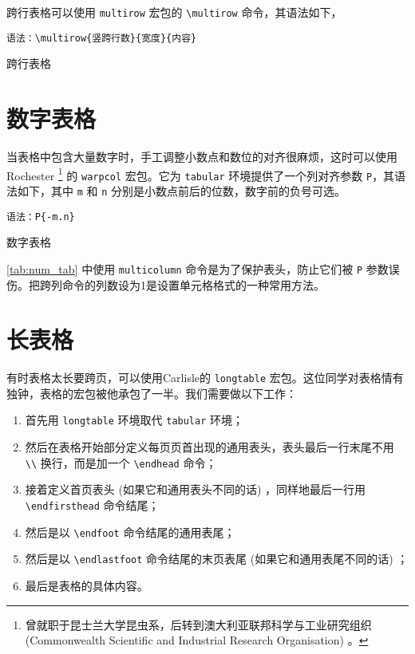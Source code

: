 跨行表格可以使用 \texttt{multirow} 宏包的 \verb|\multirow| 命令，其语法如下，

\verb|语法：\multirow{竖跨行数}{宽度}{内容}|

\begin{example}[h]
\caption{跨行表格}
\label{tab:multirow_tab}
\end{example}

\section{数字表格}

当表格中包含大量数字时，手工调整小数点和数位的对齐很麻烦，这时可以使用Rochester\indexRochester{} \footnote{曾就职于昆士兰大学昆虫系，后转到澳大利亚联邦科学与工业研究组织 (Commonwealth Scientific and Industrial Research Organisation) 。} 的 \texttt{warpcol} 宏包\citep{Rochester_2007}。它为 \texttt{tabular} 环境提供了一个列对齐参数 \texttt{P}，其语法如下，其中 \texttt{m} 和 \texttt{n} 分别是小数点前后的位数，数字前的负号可选。

\verb|语法：P{-m.n}|

\begin{example}[!h]
\caption{数字表格}
\label{tab:num_tab}
\end{example}

\autoref{tab:num_tab} 中使用 \verb|multicolumn| 命令是为了保护表头，防止它们被 \texttt{P} 参数误伤。把跨列命令的列数设为1是设置单元格格式的一种常用方法。

\section{长表格}

有时表格太长要跨页，可以使用Carlisle\indexCarlisle 的 \texttt{longtable} 宏包\citep{Carlisle_2004}。这位同学对表格情有独钟，表格的宏包被他承包了一半。我们需要做以下工作：

\begin{enumerate}
    \item 首先用 \texttt{longtable} 环境取代 \texttt{tabular} 环境；
    \item 然后在表格开始部分定义每页页首出现的通用表头，表头最后一行末尾不用 \verb|\\| 换行，而是加一个 \verb|\endhead| 命令；
    \item 接着定义首页表头 (如果它和通用表头不同的话) ，同样地最后一行用 \verb|\endfirsthead| 命令结尾；
    \item 然后是以 \verb|\endfoot| 命令结尾的通用表尾；
    \item 然后是以 \verb|\endlastfoot| 命令结尾的末页表尾 (如果它和通用表尾不同的话) ；
    \item 最后是表格的具体内容。
\end{enumerate}

